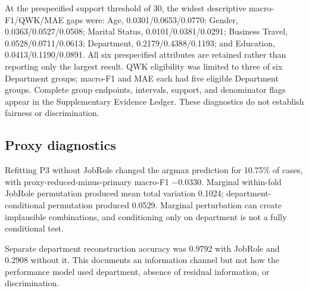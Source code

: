 \documentclass[information,article,submit,pdftex,moreauthors]{Definitions/mdpi}
\begin{document}
At the prespecified support threshold of 30, the widest descriptive macro-F1/QWK/MAE gaps were: Age, 0.0301/0.0653/0.0770; Gender, 0.0363/0.0527/0.0508; Marital Status, 0.0101/0.0381/0.0291; Business Travel, 0.0528/0.0711/0.0613; Department, 0.2179/0.4388/0.1193; and Education, 0.0413/0.1190/0.0891. All six prespecified attributes are retained rather than reporting only the largest result. QWK eligibility was limited to three of six Department groups; macro-F1 and MAE each had five eligible Department groups. Complete group endpoints, intervals, support, and denominator flags appear in the Supplementary Evidence Ledger. These diagnostics do not establish fairness or discrimination.

\begin{table}[H]
\centering\scriptsize
\caption{P3 descriptive subgroup gaps at support threshold 30}
\label{tab:8}
\end{table}

\subsection{Proxy diagnostics}

Refitting P3 without JobRole changed the argmax prediction for 10.75\% of cases, with proxy-reduced-minus-primary macro-F1 −0.0330. Marginal within-fold JobRole permutation produced mean total variation 0.1024; department-conditional permutation produced 0.0529. Marginal perturbation can create implausible combinations, and conditioning only on department is not a fully conditional test.

Separate department reconstruction accuracy was 0.9792 with JobRole and 0.2908 without it. This documents an information channel but not how the performance model used department, absence of residual information, or discrimination.
\end{document}
